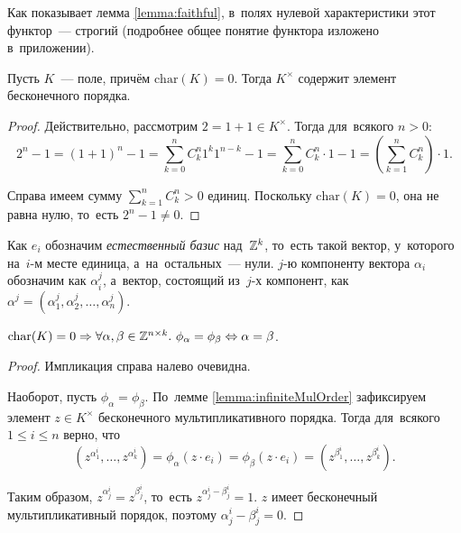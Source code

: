 Как показывает лемма \ref{lemma:faithful}, в~полях нулевой характеристики этот функтор~— строгий
(подробнее общее понятие функтора изложено в~приложении).

\begin{lemma}
\label{lemma:infiniteMulOrder}
  Пусть $K$~— поле, причём $\mathrm{char}(K) = 0$.
  Тогда $K^\times$ содержит элемент бесконечного порядка.
\end{lemma}

\begin{proof}
  Действительно, рассмотрим $2 = 1 + 1 \in K^\times$. Тогда для~всякого $n > 0$:
  \[
      2^n - 1 = (1 + 1)^n - 1 = \sum_{k = 0}^n C^n_k 1^k 1^{n - k} - 1
                              = \sum_{k = 0}^n C^n_k \cdot 1 - 1
                              = \left(\sum_{k = 1}^n C^n_k \right) \cdot 1.
  \]

  Справа имеем сумму $\sum_{k = 1}^n C^n_k > 0$ единиц. Поскольку $\mathrm{char}(K) = 0$,
  она не равна нулю, то~есть $2^n - 1 \neq 0$.
\end{proof}

Как $e_i$ обозначим \textit{естественный базис} над~$\mathbb{Z}^k$, то~есть такой вектор, у~которого на~$i$-м месте единица, а~на~остальных~— нули.
$j$-ю компоненту вектора $\alpha_i$ обозначим как $\alpha_i^j$, а~вектор, состоящий из~$j$-х компонент,
как $\alpha^j = (\alpha_1^j, \alpha_2^j, \ldots, \alpha_n^j)$.

\begin{lemma}
\label{lemma:faithful}
  $
    \mathrm{char}(K) = 0 \Rightarrow \forall \alpha, \beta \in \mathbb{Z}^{n \times k}.\ \phi_\alpha = \phi_\beta \Leftrightarrow \alpha = \beta
  $.
\end{lemma}

\begin{proof}
  Импликация справа налево очевидна.

  Наоборот, пусть $\phi_\alpha = \phi_\beta$. По~лемме \ref{lemma:infiniteMulOrder} зафиксируем
  элемент $z \in K^\times$ бесконечного мультипликативного порядка.
  Тогда для~всякого $1 \leq i \leq n$ верно, что
  \[
    (z^{\alpha_1^i}, \ldots, z^{\alpha_k^i}) = \phi_\alpha(z \cdot e_i) = \phi_\beta(z \cdot e_i) = (z^{\beta_1^i}, \ldots, z^{\beta_k^i}).
  \]

  Таким образом, $z^{\alpha_j^i} = z^{\beta_j^i}$, то~есть $z^{\alpha_j^i - \beta_j^i} = 1$.
  $z$ имеет бесконечный мультипликативный порядок, поэтому $\alpha_j^i - \beta_j^i = 0$.
\end{proof}

